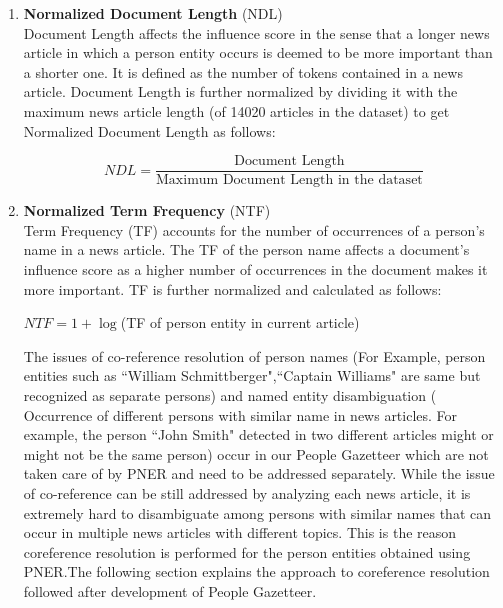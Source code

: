 \begin{enumerate}
\item \textbf{Normalized Document Length} (NDL)\\
Document Length affects the influence score in the sense that a longer news article in which a person entity occurs is deemed to be more important than a shorter one. It is defined as the number of tokens contained in a news article. Document Length is further normalized by dividing it with the maximum news article length (of 14020 articles in the dataset) to get Normalized Document Length as follows: 

$$NDL=\dfrac{\text{Document Length}} {\text{Maximum Document Length in the dataset}}$$



\item\textbf{ Normalized Term Frequency} (NTF)\\
Term Frequency (TF) accounts for the number of occurrences of a person's name in a news article. The TF of the person name affects a document's influence score as a higher number of occurrences in the document makes it more important. TF is further normalized and calculated as follows:

\begin{center}
$NTF=	1	+\log	$(TF of person entity in current article)
\end{center}


The issues of co-reference resolution of person names (For Example, person entities such as ``William Schmittberger",``Captain Williams" are same but recognized as separate persons) and named entity disambiguation ( Occurrence of different persons with similar name in news articles. For example, the person ``John Smith" detected in two different articles might or might not be the same person) occur in our People Gazetteer which are not taken care of by PNER and need to be addressed separately. While the issue of co-reference can be still addressed by analyzing each news article, it is extremely hard to disambiguate among persons with similar names that can occur in multiple news articles with different topics. This is the reason coreference resolution is performed for the person entities obtained using PNER.The following section explains the approach to coreference resolution followed after development of People Gazetteer.



\end{enumerate}
